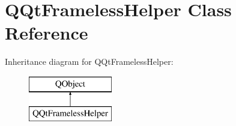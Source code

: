 \hypertarget{class_q_qt_frameless_helper}{}\section{Q\+Qt\+Frameless\+Helper Class Reference}
\label{class_q_qt_frameless_helper}
Inheritance diagram for Q\+Qt\+Frameless\+Helper\+:\begin{figure}[H]
\begin{center}
\leavevmode
\includegraphics[height=2.000000cm]{class_q_qt_frameless_helper}
\end{center}
\end{figure}

